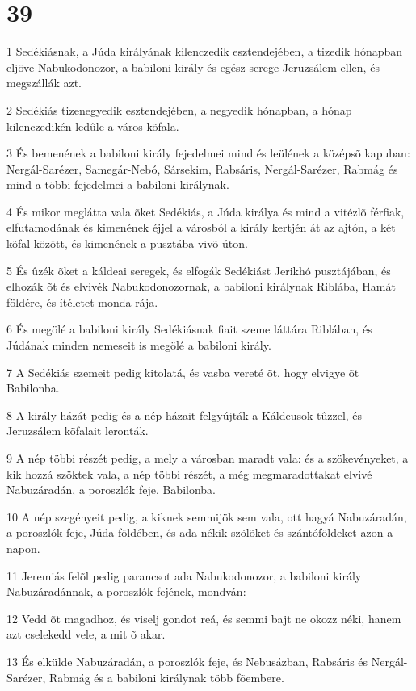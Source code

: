 \chapter{39}

\par 1 Sedékiásnak, a Júda királyának kilenczedik esztendejében, a tizedik hónapban eljöve Nabukodonozor, a babiloni király és egész serege Jeruzsálem ellen, és megszállák azt.
\par 2 Sedékiás tizenegyedik esztendejében, a negyedik hónapban, a hónap kilenczedikén ledûle a város kõfala.
\par 3 És bemenének a babiloni király fejedelmei mind és leülének a középsõ kapuban: Nergál-Sarézer, Samegár-Nebó, Sársekim, Rabsáris, Nergál-Sarézer, Rabmág és mind a többi fejedelmei a babiloni királynak.
\par 4 És mikor meglátta vala õket Sedékiás, a Júda királya és mind a vitézlõ férfiak, elfutamodának és kimenének éjjel a városból a király kertjén át az ajtón, a két kõfal között, és kimenének a pusztába vivõ úton.
\par 5 És ûzék õket a káldeai seregek, és elfogák Sedékiást Jerikhó pusztájában, és elhozák õt és elvivék Nabukodonozornak, a babiloni királynak Riblába, Hamát földére, és ítéletet monda rája.
\par 6 És megölé a babiloni király Sedékiásnak fiait szeme láttára Riblában, és Júdának minden nemeseit is megölé a babiloni király.
\par 7 A Sedékiás szemeit pedig kitolatá, és vasba vereté õt, hogy elvigye õt Babilonba.
\par 8 A király házát pedig és a nép házait felgyújták a Káldeusok tûzzel, és Jeruzsálem kõfalait leronták.
\par 9 A nép többi részét pedig, a mely a városban maradt vala: és a szökevényeket, a kik hozzá szöktek vala, a nép többi részét, a még megmaradottakat elvivé Nabuzáradán, a poroszlók feje, Babilonba.
\par 10 A nép szegényeit pedig, a kiknek semmijök sem vala, ott hagyá Nabuzáradán, a poroszlók feje, Júda földében, és ada nékik szõlõket és szántóföldeket azon a napon.
\par 11 Jeremiás felõl pedig parancsot ada Nabukodonozor, a babiloni király Nabuzáradánnak, a poroszlók fejének, mondván:
\par 12 Vedd õt magadhoz, és viselj gondot reá, és semmi bajt ne okozz néki, hanem azt cselekedd vele, a mit õ akar.
\par 13 És elkülde Nabuzáradán, a poroszlók feje, és Nebusázban, Rabsáris és Nergál-Sarézer, Rabmág és a babiloni királynak több fõembere.
